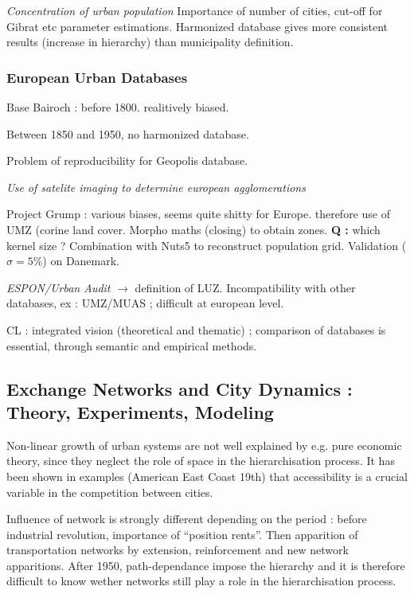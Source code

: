 \textit{Concentration of urban population} Importance of number of cities, cut-off for Gibrat etc parameter estimations. Harmonized database gives more consistent results (increase in hierarchy) than municipality definition.



\subsubsection{European Urban Databases}

Base Bairoch : before 1800. realitively biased.

Between 1850 and 1950, no harmonized database. 

Problem of reproducibility for Geopolis database.

\textit{Use of satelite imaging to determine european agglomerations}

Project Grump : various biases, seems quite shitty for Europe. therefore use of UMZ (corine land cover. Morpho maths (closing) to obtain zones. \textbf{Q : } which kernel size ? Combination with Nuts5 to reconstruct population grid. Validation ($\sigma = 5\%$) on Danemark.


\textit{ESPON/Urban Audit} $\rightarrow$ definition of LUZ. Incompatibility with other databases, ex : UMZ/MUAS ; difficult at european level.

CL : integrated vision (theoretical and thematic) ; comparison of databases is essential, through semantic and empirical methods.





\subsection{Exchange Networks and City Dynamics : Theory, Experiments, Modeling}

Non-linear growth of urban systems are not well explained by e.g. pure economic theory, since they neglect the role of space in the hierarchisation process. It has been shown in examples (American East Coast 19th) that accessibility is a crucial variable in the competition between cities.

Influence of network is strongly different depending on the period : before industrial revolution, importance of ``position rents''. Then apparition of transportation networks by extension, reinforcement and new network apparitions. After 1950, path-dependance impose the hierarchy and it is therefore difficult to know wether networks still play a role in the hierarchisation process.

